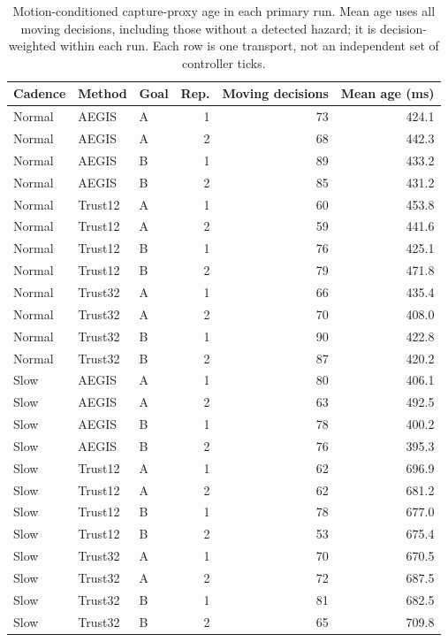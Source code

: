 \begin{table}[H]
\centering\small
\caption{Motion-conditioned capture-proxy age in each primary run. Mean age uses all moving decisions, including those without a detected hazard; it is decision-weighted within each run. Each row is one transport, not an independent set of controller ticks.}\label{tab:motion-age-runs}
\begin{tabular}{lllrrr}
\toprule
Cadence & Method & Goal & Rep. & Moving decisions & Mean age (ms)\\
\midrule
Normal & AEGIS & A & 1 & 73 & 424.1\\
Normal & AEGIS & A & 2 & 68 & 442.3\\
Normal & AEGIS & B & 1 & 89 & 433.2\\
Normal & AEGIS & B & 2 & 85 & 431.2\\
Normal & Trust12 & A & 1 & 60 & 453.8\\
Normal & Trust12 & A & 2 & 59 & 441.6\\
Normal & Trust12 & B & 1 & 76 & 425.1\\
Normal & Trust12 & B & 2 & 79 & 471.8\\
Normal & Trust32 & A & 1 & 66 & 435.4\\
Normal & Trust32 & A & 2 & 70 & 408.0\\
Normal & Trust32 & B & 1 & 90 & 422.8\\
Normal & Trust32 & B & 2 & 87 & 420.2\\
Slow & AEGIS & A & 1 & 80 & 406.1\\
Slow & AEGIS & A & 2 & 63 & 492.5\\
Slow & AEGIS & B & 1 & 78 & 400.2\\
Slow & AEGIS & B & 2 & 76 & 395.3\\
Slow & Trust12 & A & 1 & 62 & 696.9\\
Slow & Trust12 & A & 2 & 62 & 681.2\\
Slow & Trust12 & B & 1 & 78 & 677.0\\
Slow & Trust12 & B & 2 & 53 & 675.4\\
Slow & Trust32 & A & 1 & 70 & 670.5\\
Slow & Trust32 & A & 2 & 72 & 687.5\\
Slow & Trust32 & B & 1 & 81 & 682.5\\
Slow & Trust32 & B & 2 & 65 & 709.8\\
\bottomrule
\end{tabular}
\end{table}
